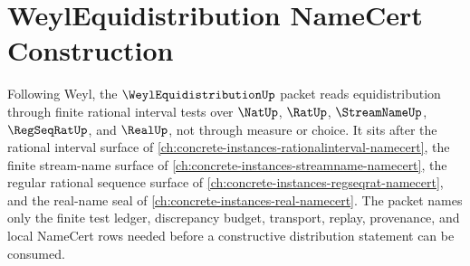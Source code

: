 \chapter{WeylEquidistribution NameCert Construction}
\label{ch:concrete-instances-weyl-equidistribution-namecert}

Following Weyl, the $\WeylEquidistributionUp$ packet reads equidistribution through finite rational interval tests over $\NatUp$, $\RatUp$, $\StreamNameUp$, $\RegSeqRatUp$, and $\RealUp$, not through measure or choice. It sits after the rational interval surface of \autoref{ch:concrete-instances-rationalinterval-namecert}, the finite stream-name surface of \autoref{ch:concrete-instances-streamname-namecert}, the regular rational sequence surface of \autoref{ch:concrete-instances-regseqrat-namecert}, and the real-name seal of \autoref{ch:concrete-instances-real-namecert}. The packet names only the finite test ledger, discrepancy budget, transport, replay, provenance, and local NameCert rows needed before a constructive distribution statement can be consumed.

